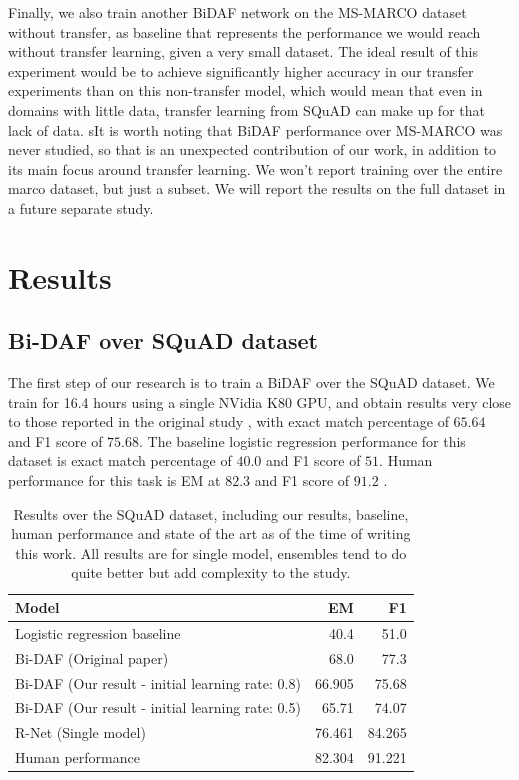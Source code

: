 \documentclass[11pt,a4paper]{article}
\begin{document}
Finally, we also train another BiDAF network on the MS-MARCO dataset without transfer, as baseline that represents the performance we would reach without transfer learning, given a very small dataset. The ideal result of this experiment would be to achieve significantly higher accuracy in our transfer experiments than on this non-transfer model, which would mean that even in domains with little data, transfer learning from SQuAD can make up for that lack of data. sIt is worth noting that BiDAF performance over MS-MARCO was never studied, so that is an unexpected contribution of our work, in addition to its main focus around transfer learning. We won't report training over the entire marco dataset, but just a subset. We will report the results on the full dataset in a future separate study.

\section{Results}
\label{sec:results}

\subsection{Bi-DAF over SQuAD dataset}

The first step of our research is to train a BiDAF over the SQuAD dataset. We train for 16.4 hours using a single NVidia K80 GPU, and obtain results very close to those reported in the original study \cite{bidaf:2017}, with exact match percentage of $65.64$ and F1 score of $75.68$. The baseline logistic regression performance for this dataset is exact match percentage of $40.0$ and F1 score of $51$. Human performance for this task is EM at $82.3$ and F1 score of $91.2$ \cite{squad:2016} \cite{rnet}.

\begin{table}[t!]
\begin{center}
\begin{tabular}{|l|r|r|}
\hline \bf Model & \bf EM & \bf F1 \\ \hline
Logistic regression baseline  \cite{squad:2016} & 40.4 & 51.0 \\
Bi-DAF (Original paper) & 68.0 & 77.3 \\
Bi-DAF (Our result - initial learning rate: 0.8) & 66.905 &  75.68 \\
Bi-DAF (Our result - initial learning rate: 0.5) & 65.71 & 74.07\\
R-Net (Single model) & 76.461 & 84.265 \\
Human performance \cite{squad:2016} & 82.304 & 91.221 \\
\end{tabular}
\end{center}
\caption{\label{squad-table} Results over the SQuAD dataset, including our results, baseline, human performance and state of the art as of the time of writing this work. All results are for single model, ensembles tend to do quite better but add complexity to the study.}
\end{table}
\end{document}
